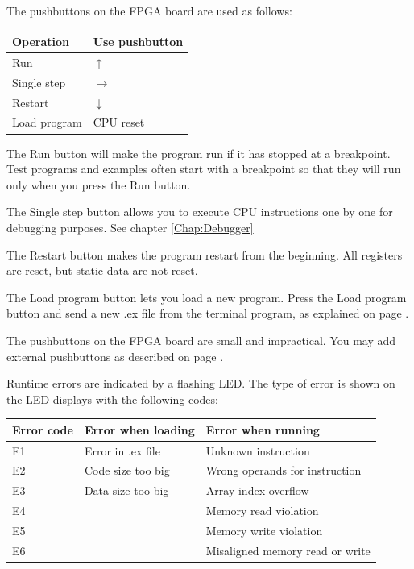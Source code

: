 \documentclass[11pt,a4paper,oneside,openright]{report}
\newcommand{\vv}{ \vspace{2mm} }   %
\begin{document}
The pushbuttons on the FPGA board are used as follows:
\vv

\begin{tabular}{|l|l|} 
\hline
\bfseries Operation  & \bfseries Use pushbutton  \\ \hline
Run  &  $\uparrow$  \\ \hline
Single step  &  $\rightarrow$  \\ \hline
Restart  &  $\downarrow$  \\ \hline
Load program  &  CPU reset  \\ \hline
\end{tabular}
\vv

The Run button will make the program run if it has stopped at a breakpoint. Test programs and examples often start with a breakpoint so that they will run only when you press the Run button.
\vv

The Single step button allows you to execute CPU instructions one by one for debugging purposes. See chapter \ref{Chap:Debugger}
\vv

The Restart button makes the program restart from the beginning. All registers are reset, but static data are not reset.
\vv

The Load program button lets you load a new program. Press the Load program button and send a new .ex file from the terminal program, as explained on page \pageref{Chap:GettingStarted}.
\vv

The pushbuttons on the FPGA board are small and impractical. You may add external pushbuttons as described on page \pageref{Chap:ExternalPushbuttons}.
\vv

Runtime errors are indicated by a flashing LED. The type of error is shown on the LED displays with the following codes:
\vv

\begin{tabular}{|l|l|l|} 
\hline
\bfseries Error code  & \bfseries Error when loading & \bfseries Error when running  \\ \hline
E1  & Error in .ex file & Unknown instruction \\ \hline
E2  & Code size too big & Wrong operands for instruction \\ \hline
E3  & Data size too big & Array index overflow \\ \hline
E4  &  & Memory read violation \\ \hline
E5  &  & Memory write violation \\ \hline
E6  &  & Misaligned memory read or write \\ \hline
\end{tabular}
\vv
\end{document}
